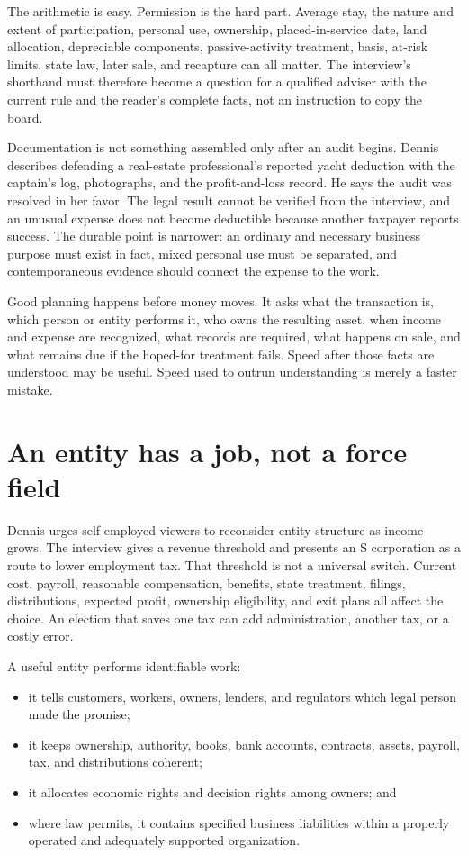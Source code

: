 The arithmetic is easy. Permission is the hard part. Average stay, the nature
and extent of participation, personal use, ownership, placed-in-service date,
land allocation, depreciable components, passive-activity treatment, basis,
at-risk limits, state law, later sale, and recapture can all matter. The
interview's shorthand must therefore become a question for a qualified adviser
with the current rule and the reader's complete facts, not an instruction to
copy the board.

Documentation is not something assembled only after an audit begins. Dennis
describes defending a real-estate professional's reported yacht deduction with
the captain's log, photographs, and the profit-and-loss record. He says the
audit was resolved in her favor. The legal result cannot be verified from the
interview, and an unusual expense does not become deductible because another
taxpayer reports success. The durable point is narrower: an ordinary and
necessary business purpose must exist in fact, mixed personal use must be
separated, and contemporaneous evidence should connect the expense to the
work.

Good planning happens before money moves. It asks what the transaction is,
which person or entity performs it, who owns the resulting asset, when income
and expense are recognized, what records are required, what happens on sale,
and what remains due if the hoped-for treatment fails. Speed after those facts
are understood may be useful. Speed used to outrun understanding is merely a
faster mistake.

\section{An entity has a job, not a force field}

Dennis urges self-employed viewers to reconsider entity structure as income
grows. The interview gives a revenue threshold and presents an S corporation
as a route to lower employment tax. That threshold is not a universal switch.
Current cost, payroll, reasonable compensation, benefits, state treatment,
filings, distributions, expected profit, ownership eligibility, and exit plans
all affect the choice. An election that saves one tax can add administration,
another tax, or a costly error.

A useful entity performs identifiable work:

\begin{itemize}[itemsep=0.13em]
\item it tells customers, workers, owners, lenders, and regulators which legal
  person made the promise;
\item it keeps ownership, authority, books, bank accounts, contracts, assets,
  payroll, tax, and distributions coherent;
\item it allocates economic rights and decision rights among owners; and
\item where law permits, it contains specified business liabilities within a
  properly operated and adequately supported organization.
\end{itemize}

